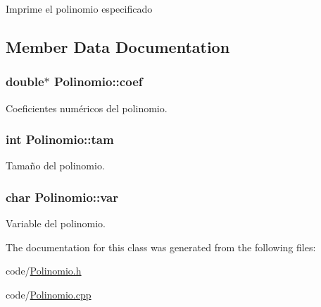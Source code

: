 Imprime el polinomio especificado 

\subsection{Member Data Documentation}
\hypertarget{class_polinomio_a14c45ccfc7450fb0fed2e5e6f45afb54}{
\subsubsection[{coef}]{\setlength{\rightskip}{0pt plus 5cm}double$\ast$ Polinomio\+::coef}}\label{class_polinomio_a14c45ccfc7450fb0fed2e5e6f45afb54}


Coeficientes numéricos del polinomio. 

\hypertarget{class_polinomio_a4e1570a5d708ee593dd835fd886762f4}{
\subsubsection[{tam}]{\setlength{\rightskip}{0pt plus 5cm}int Polinomio\+::tam}}\label{class_polinomio_a4e1570a5d708ee593dd835fd886762f4}


Tamaño del polinomio. 

\hypertarget{class_polinomio_ac2471ef9aad80fb06f9ab99086d04af4}{
\subsubsection[{var}]{\setlength{\rightskip}{0pt plus 5cm}char Polinomio\+::var}}\label{class_polinomio_ac2471ef9aad80fb06f9ab99086d04af4}


Variable del polinomio. 



The documentation for this class was generated from the following files\+:\begin{DoxyCompactItemize}
\item 
code/\hyperlink{_polinomio_8h}{Polinomio.\+h}\item 
code/\hyperlink{_polinomio_8cpp}{Polinomio.\+cpp}\end{DoxyCompactItemize}
